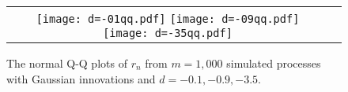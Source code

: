 \documentclass[11pt]{article}
\begin{document}
\begin{figure}[H]
\centering
\begin{tabular}{cc}
\texttt{[image: d=-01qq.pdf]}
\texttt{[image: d=-09qq.pdf]}
\texttt{[image: d=-35qq.pdf]}
\end{tabular}
\caption {The normal Q-Q plots of $r_n$ from $m=1,000$ simulated processes with Gaussian innovations and $d=-0.1, -0.9, -3.5$.\label{fig:2}}
\end{figure}
%
\end{document}
